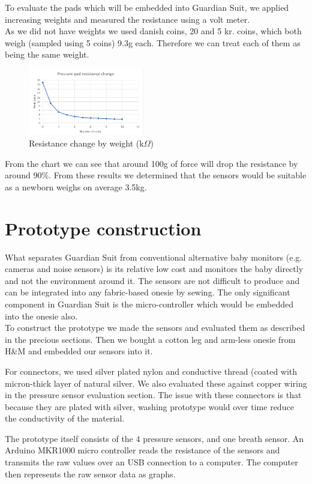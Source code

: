 \documentclass{sigchi-ext}
\begin{document}
To evaluate the pads which will be embedded into Guardian Suit, we applied 
increasing weights and measured the resistance using a volt meter.\\
As we did not have weights we used danish coins, 20 and 5 kr. coins, which both
weigh (sampled using 5 coins) 9.3g each. Therefore we can treat each of them as
being the same weight.
\begin{figure} [H]
   \centering \includegraphics[width=0.45\textwidth]{img/chart.PNG}
    \caption{Resistance change by weight (k$\Omega$)}
\end{figure}
From the chart we can see that around 100g of force will drop the resistance
by around 90\%. From these results we determined that the sensors would be suitable
as a newborn weighs on average 3.5kg.

\clearpage

\section{Prototype construction}
What separates Guardian Suit from conventional alternative baby monitors 
(e.g. cameras and noise sensors) is its relative low cost and monitors the
baby directly and not the environment around it. The 
sensors are not difficult to produce and can be integrated into any fabric-based
onesie by sewing. The only significant component in Guardian Suit is the
micro-controller which would be embedded into the onesie also.\\
To construct the prototype we made the sensors and evaluated them as
described in the precious sections. Then we bought a cotton leg and arm-less
onesie from H\&M and embedded our sensors into it.

For connectors, we used silver plated nylon and conductive thread (coated with
micron-thick layer of natural silver. We also evaluated these against copper
wiring in the pressure sensor evaluation section. The issue with these
connectors is that because they are plated with silver, washing prototype
would over time reduce the conductivity of the material.

The prototype itself consists of the 4 pressure sensors, and one breath sensor. 
An Arduino MKR1000 micro controller reads the resistance of the sensors and transmits the raw values over an USB connection to a computer. The computer then represents the raw sensor data as graphs.
\end{document}
